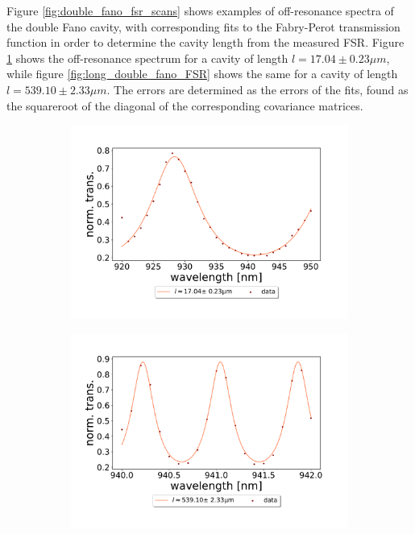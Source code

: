 Figure \ref{fig:double_fano_fsr_scans} shows examples of off-resonance spectra of the double Fano cavity, with corresponding fits to the Fabry-Perot transmission function in order to determine the cavity length from the measured FSR. Figure \ref{fig:short_double_fano_FSR} shows the off-resonance spectrum for a cavity of length $l = 17.04 \pm 0.23 \mu m$, while figure \ref{fig:long_double_fano_FSR} shows the same for a cavity of length $l = 539.10 \pm 2.33 \mu m$. The errors are determined as the errors of the fits, found as the squareroot of the diagonal of the corresponding covariance matrices. 

\begin{figure}[h!]
    \centering
    \begin{subfigure}[b]{0.49\textwidth}
        \centering
        \includegraphics[width=\textwidth]{figures/results/double fano fits/30um_M3:M5_FSR_scan.pdf}
        \caption{}
        \label{fig:short_double_fano_FSR}
    \end{subfigure}
    \begin{subfigure}[b]{0.49\textwidth}
        \centering
        \includegraphics[width=\textwidth]{figures/results/double fano fits/550um_M3:M5_FSR_scan.pdf}

\end{subfigure}
\end{figure}
